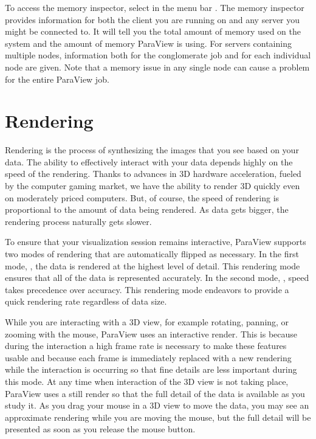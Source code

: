 To access the memory inspector, select in the menu bar  \ra
{}. The memory inspector provides information for both
the client you are running on and any server you might be connected to. It
will tell you the total amount of memory used on the system and the amount
of memory ParaView is using. For servers containing multiple nodes,
information both for the conglomerate job and for each individual node are
given. Note that a memory issue in any single node can cause a problem for
the entire ParaView job.



\section{Rendering}


Rendering is the process of synthesizing the images that you see based on
your data.  The ability to effectively interact with your data depends
highly on the speed of the rendering.  Thanks to advances in 3D hardware
acceleration, fueled by the computer gaming market, we have the ability to
render 3D quickly even on moderately priced computers.  But, of course, the
speed of rendering is proportional to the amount of data being rendered.
As data gets bigger, the rendering process naturally gets slower.


To ensure that your visualization session remains interactive, ParaView
supports two modes of rendering that are automatically flipped as
necessary.  In the first mode, , the data is rendered
at the highest level of detail.  This rendering mode ensures that all of
the data is represented accurately.  In the second mode,
, speed takes precedence over accuracy.  This
rendering mode endeavors to provide a quick rendering rate regardless of
data size.

While you are interacting with a 3D view, for example rotating, panning, or
zooming with the mouse, ParaView uses an interactive render.  This is
because during the interaction a high frame rate is necessary to make these
features usable and because each frame is immediately replaced with a new
rendering while the interaction is occurring so that fine details are less
important during this mode.  At any time when interaction of the 3D view is
not taking place, ParaView uses a still render so that the full detail of
the data is available as you study it.  As you drag your mouse in a 3D view
to move the data, you may see an approximate rendering while you are moving
the mouse, but the full detail will be presented as soon as you release the
mouse button.

